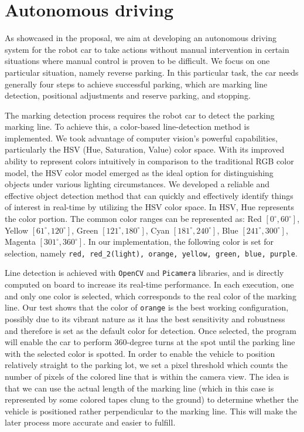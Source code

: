 \documentclass[acmsmall]{acmart}
\begin{document}
\section{Autonomous driving}
As showcased in the proposal, we aim at developing an autonomous driving system for the robot car to take actions without manual intervention in certain situations where manual control is proven to be difficult. We focus on one particular situation, namely reverse parking. In this particular task, the car needs generally four steps to achieve successful parking, which are marking line detection, positional adjustments and reserve parking, and stopping.

The marking detection process requires the robot car to detect the parking marking line. To achieve this, a color-based line-detection method is implemented. We took advantage of computer vision's powerful capabilities, particularly the HSV (Hue, Saturation, Value) color space. With its improved ability to represent colors intuitively in comparison to the traditional RGB color model, the HSV color model emerged as the ideal option for distinguishing objects under various lighting circumstances. We developed a reliable and effective object detection method that can quickly and effectively identify things of interest in real-time by utilizing the HSV color space. In HSV, Hue represents the color portion.\cite{HSV} The common color ranges can be represented as: Red $[0^\circ,60^\circ]$, Yellow $[61^\circ,120^\circ]$, Green $[121^\circ,180^\circ]$, Cyan $[181^\circ,240^\circ]$, Blue $[241^\circ,300^\circ]$, Magenta $[301^\circ,360^\circ]$. In our implementation, the following color is set for selection, namely \texttt{red, red\_2(light), orange, yellow, green, blue, purple}. 

Line detection is achieved with \texttt{OpenCV} and \texttt{Picamera} libraries, and is directly computed on board to increase its real-time performance. In each execution, one and only one color is selected, which corresponds to the real color of the marking line. Our test shows that the color of \texttt{orange} is the best working configuration, possibly due to its vibrant nature as it has the best sensitivity and robustness and therefore is set as the default color for detection. Once selected, the program will enable the car to perform 360-degree turns at the spot until the parking line with the selected color is spotted. In order to enable the vehicle to position relatively straight to the parking lot, we set a pixel threshold which counts the number of pixels of the colored line that is within the camera view. The idea is that we can use the actual length of the marking line (which in this case is represented by some colored tapes clung to the ground) to determine whether the vehicle is positioned rather perpendicular to the marking line. This will make the later process more accurate and easier to fulfill.
\end{document}
